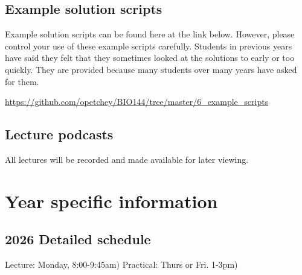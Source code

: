 \documentclass[
  letterpaper,
  8pt,
  a4paper]{book}
\begin{document}
\section*{Example solution scripts}\label{example-solution-scripts}


Example solution scripts can be found here at the link below. However,
please control your use of these example scripts carefully. Students in
previous years have said they felt that they sometimes looked at the
solutions to early or too quickly. They are provided because many
students over many years have asked for them.

\url{https://github.com/opetchey/BIO144/tree/master/6_example_scripts}

\section*{Lecture podcasts}\label{lecture-podcasts}


All lectures will be recorded and made available for later viewing.


\chapter*{Year specific information}\label{year-specific-information}


\section*{2026 Detailed schedule}\label{detailed-schedule}


Lecture: Monday, 8:00-9:45am) Practical: Thurs or Fri. 1-3pm)
\end{document}
